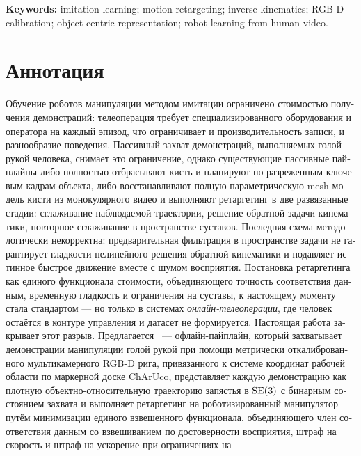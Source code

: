 \documentclass[12pt, a4paper, oneside]{report}
\begin{document}
\vspace{3mm}
\noindent\textbf{Keywords:} imitation learning; motion retargeting; inverse
kinematics; RGB-D calibration; object-centric representation; robot learning
from human video.

\chapter*{Аннотация}
\begin{russian}

Обучение роботов манипуляции методом имитации ограничено стоимостью получения
демонстраций: телеоперация требует специализированного оборудования и
оператора на каждый эпизод, что ограничивает и производительность записи, и
разнообразие поведения. Пассивный захват демонстраций, выполняемых голой рукой
человека, снимает это ограничение, однако существующие пассивные пайплайны либо
полностью отбрасывают кисть и планируют по разреженным ключевым кадрам объекта,
либо восстанавливают полную параметрическую mesh-модель кисти из монокулярного
видео и выполняют ретаргетинг в две развязанные стадии: сглаживание наблюдаемой
траектории, решение обратной задачи кинематики, повторное сглаживание в
пространстве суставов. Последняя схема методологически некорректна:
предварительная фильтрация в пространстве задачи не гарантирует гладкости
нелинейного решения обратной кинематики и подавляет истинное быстрое движение
вместе с шумом восприятия. Постановка ретаргетинга как единого функционала
стоимости, объединяющего точность соответствия данным, временную гладкость и
ограничения на суставы, к настоящему моменту стала стандартом --- но только в
системах \emph{онлайн-телеоперации}, где человек остаётся в контуре управления и
датасет не формируется. Настоящая работа закрывает этот разрыв. Предлагается
\viki\ --- офлайн-пайплайн, который захватывает демонстрации манипуляции голой
рукой при помощи метрически откалиброванного мультикамерного RGB-D рига,
привязанного к системе координат рабочей области по маркерной доске ChArUco,
представляет каждую демонстрацию как плотную объектно-относительную траекторию
запястья в $\mathrm{SE}(3)$ с бинарным состоянием захвата и выполняет ретаргетинг на
роботизированный манипулятор путём минимизации единого взвешенного функционала,
объединяющего член соответствия данным со взвешиванием по достоверности
восприятия, штраф на скорость и штраф на ускорение при ограничениях на

\end{russian}
\end{document}
